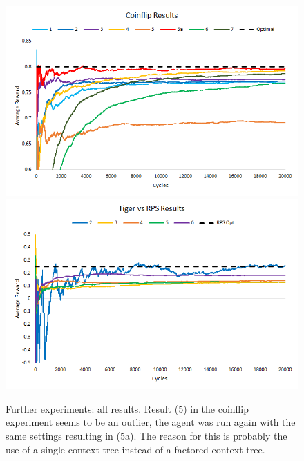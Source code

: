 \documentclass[paper=a4, fontsize=11pt]{scrartcl} %
\numberwithin{equation}{section} %
\numberwithin{figure}{section} %
\numberwithin{table}{section} %
\begin{document}
\begin{figure}
\includegraphics[width=\textwidth]{plots/coinflip_tests}
\includegraphics[width=\textwidth]{plots/rps_tiger_trim}
\caption{\label{plot:cointests_all}Further experiments: all results. Result (5) in the coinflip experiment seems to be an outlier, the agent was run again with the same settings resulting in (5a). The reason for this is probably the use of a single context tree instead of a factored context tree.}
\end{figure}

%


%




\end{document}
